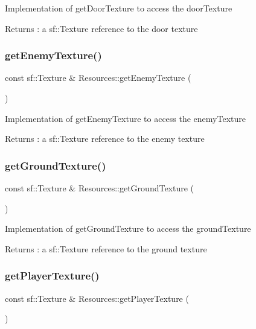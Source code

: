 Implementation of get\+Door\+Texture to access the door\+Texture \begin{DoxyReturn}{Returns}
\+: a sf\+::\+Texture reference to the door texture 
\end{DoxyReturn}
\hypertarget{class_resources_ad9ea9a040070bedc00927f00bf09242f}{}\label{class_resources_ad9ea9a040070bedc00927f00bf09242f} 
\subsubsection{\texorpdfstring{get\+Enemy\+Texture()}{getEnemyTexture()}}
{\footnotesize\ttfamily const sf\+::\+Texture \& Resources\+::get\+Enemy\+Texture (\begin{DoxyParamCaption}{ }\end{DoxyParamCaption})}

Implementation of get\+Enemy\+Texture to access the enemy\+Texture \begin{DoxyReturn}{Returns}
\+: a sf\+::\+Texture reference to the enemy texture 
\end{DoxyReturn}
\hypertarget{class_resources_ae75ffa794e1d7f355ad4e2d8f01901ec}{}\label{class_resources_ae75ffa794e1d7f355ad4e2d8f01901ec} 
\subsubsection{\texorpdfstring{get\+Ground\+Texture()}{getGroundTexture()}}
{\footnotesize\ttfamily const sf\+::\+Texture \& Resources\+::get\+Ground\+Texture (\begin{DoxyParamCaption}{ }\end{DoxyParamCaption})}

Implementation of get\+Ground\+Texture to access the ground\+Texture \begin{DoxyReturn}{Returns}
\+: a sf\+::\+Texture reference to the ground texture 
\end{DoxyReturn}
\hypertarget{class_resources_a168468ac127f26c5d687ec6eceedda4f}{}\label{class_resources_a168468ac127f26c5d687ec6eceedda4f} 
\subsubsection{\texorpdfstring{get\+Player\+Texture()}{getPlayerTexture()}}
{\footnotesize\ttfamily const sf\+::\+Texture \& Resources\+::get\+Player\+Texture (\begin{DoxyParamCaption}{ }\end{DoxyParamCaption})}

